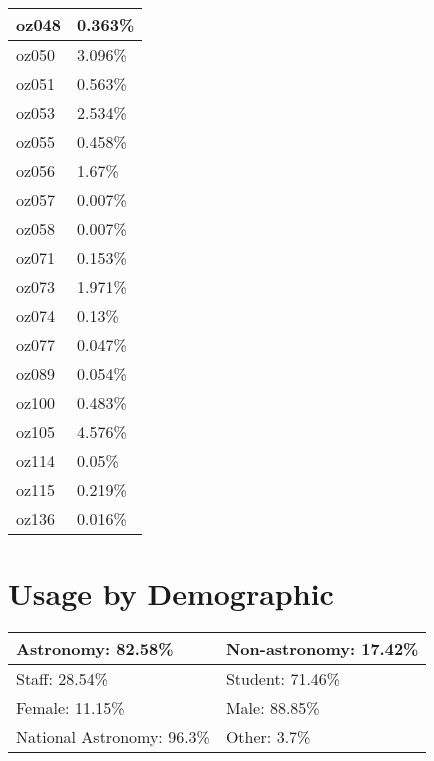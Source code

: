 \documentclass{article}%
\begin{document}
\begin{longtabu}{X[l] X[r]}
oz048&0.363\%\\%
\hline%
oz050&3.096\%\\%
\hline%
oz051&0.563\%\\%
\hline%
oz053&2.534\%\\%
\hline%
oz055&0.458\%\\%
\hline%
oz056&1.67\%\\%
\hline%
oz057&0.007\%\\%
\hline%
oz058&0.007\%\\%
\hline%
oz071&0.153\%\\%
\hline%
oz073&1.971\%\\%
\hline%
oz074&0.13\%\\%
\hline%
oz077&0.047\%\\%
\hline%
oz089&0.054\%\\%
\hline%
oz100&0.483\%\\%
\hline%
oz105&4.576\%\\%
\hline%
oz114&0.05\%\\%
\hline%
oz115&0.219\%\\%
\hline%
oz136&0.016\%\\%
\hline%
\end{longtabu}%
\section{Usage by Demographic}%

%
\begin{longtabu}{X[l] X[l]}%
Astronomy:  82.58\%&Non{-}astronomy:  17.42\%\\%
\hline%
Staff:  28.54\%&Student:  71.46\%\\%
\hline%
Female:  11.15\%&Male:  88.85\%\\%
\hline%
National Astronomy:  96.3\%&Other:  3.7\%\\%
\hline%
\end{longtabu}%
\end{document}
